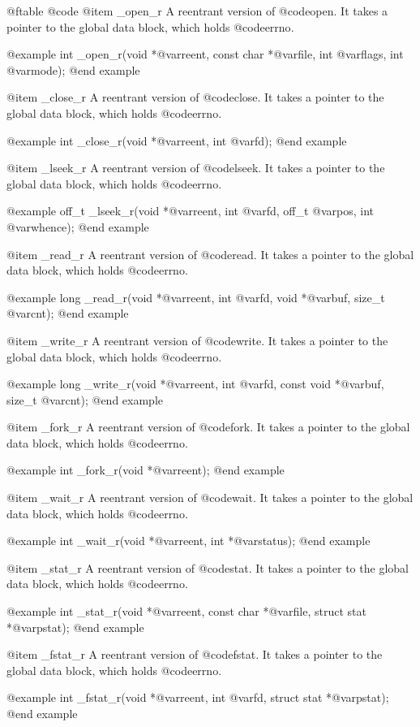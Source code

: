 @ftable @code
@item _open_r
A reentrant version of @code{open}.  It takes a pointer
to the global data block, which holds @code{errno}.

@example
int _open_r(void *@var{reent},
    const char *@var{file}, int @var{flags}, int @var{mode});
@end example

@item _close_r
A reentrant version of @code{close}.  It takes a pointer to the global
data block, which holds @code{errno}.

@example
int _close_r(void *@var{reent}, int @var{fd});
@end example

@item _lseek_r
A reentrant version of @code{lseek}.  It takes a pointer to the global
data block, which holds @code{errno}.

@example
off_t _lseek_r(void *@var{reent},
    int @var{fd}, off_t @var{pos}, int @var{whence});
@end example

@item _read_r
A reentrant version of @code{read}.  It takes a pointer to the global
data block, which holds @code{errno}.

@example
long _read_r(void *@var{reent},
    int @var{fd}, void *@var{buf}, size_t @var{cnt});
@end example

@item _write_r
A reentrant version of @code{write}.  It takes a pointer to the global
data block, which holds @code{errno}.

@example
long _write_r(void *@var{reent},
    int @var{fd}, const void *@var{buf}, size_t @var{cnt});
@end example

@item _fork_r
A reentrant version of @code{fork}.  It takes a pointer to the global
data block, which holds @code{errno}.

@example
int _fork_r(void *@var{reent});
@end example

@item _wait_r
A reentrant version of @code{wait}.  It takes a pointer to the global
data block, which holds @code{errno}.

@example
int _wait_r(void *@var{reent}, int *@var{status});
@end example

@item _stat_r
A reentrant version of @code{stat}.  It takes a pointer to the global
data block, which holds @code{errno}.

@example
int _stat_r(void *@var{reent},
    const char *@var{file}, struct stat *@var{pstat});
@end example

@item _fstat_r
A reentrant version of @code{fstat}.  It takes a pointer to the global
data block, which holds @code{errno}.

@example
int _fstat_r(void *@var{reent},
    int @var{fd}, struct stat *@var{pstat});
@end example

